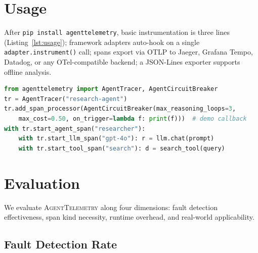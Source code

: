 \documentclass[sigconf,review]{acmart}
\begin{document}
\section{Usage}
\label{sec:usage}

After \texttt{pip install agenttelemetry}, basic instrumentation is
three lines (Listing~\ref{lst:usage}); framework adapters auto-hook
on a single \texttt{adapter.instrument()} call; spans export via OTLP
to Jaeger, Grafana Tempo, Datadog, or any OTel-compatible backend; a
JSON-Lines exporter supports offline analysis.

\begin{lstlisting}[language=Python,basicstyle=\ttfamily\tiny,frame=single,framesep=2pt,xleftmargin=2pt,caption={Three-line install + circuit-breaker.},label={lst:usage}]
from agenttelemetry import AgentTracer, AgentCircuitBreaker
tr = AgentTracer("research-agent")
tr.add_span_processor(AgentCircuitBreaker(max_reasoning_loops=3,
    max_cost=0.50, on_trigger=lambda f: print(f)))  # demo callback
with tr.start_agent_span("researcher"):
    with tr.start_llm_span("gpt-4o"): r = llm.chat(prompt)
    with tr.start_tool_span("search"): d = search_tool(query)
\end{lstlisting}

\section{Evaluation}
\label{sec:eval}

We evaluate \textsc{AgentTelemetry} along four dimensions: fault
detection effectiveness, span kind necessity, runtime overhead, and
real-world applicability.

\subsection{Fault Detection Rate}
\end{document}
